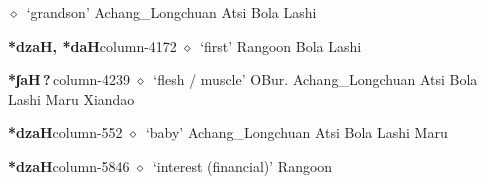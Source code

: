 \hspace{1ex}
         $\diamond$~`grandson'
         Achang\_Longchuan 
\hspace{1ex}
         Atsi 
\hspace{1ex}
         Bola 
\hspace{1ex}
         Lashi 
  \item {\footnotesize \textbf{*dzaH, *daH}}{\tiny column-4172}
         $\diamond$~`first'
         Rangoon 
\hspace{1ex}
         Bola 
\hspace{1ex}
         Lashi 
  \item {\footnotesize \textbf{*ʃaH\,?\,}}{\tiny column-4239}
         $\diamond$~`flesh / muscle'
         OBur. 
\hspace{1ex}
         Achang\_Longchuan 
\hspace{1ex}
         Atsi 
\hspace{1ex}
         Bola 
\hspace{1ex}
         Lashi 
\hspace{1ex}
         Maru 
\hspace{1ex}
         Xiandao 
  \item {\footnotesize \textbf{*dzaH}}{\tiny column-552}
         $\diamond$~`baby'
         Achang\_Longchuan 
\hspace{1ex}
         Atsi 
\hspace{1ex}
         Bola 
\hspace{1ex}
         Lashi 
\hspace{1ex}
         Maru 
  \item {\footnotesize \textbf{*dzaH}}{\tiny column-5846}
         $\diamond$~`interest (financial)'
         Rangoon 
